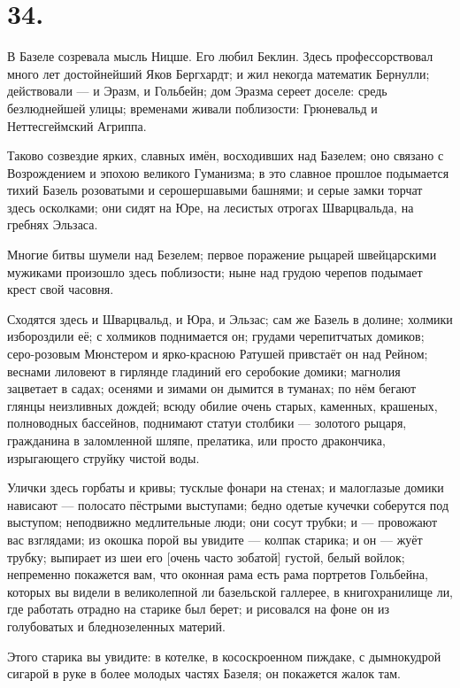 \documentclass[12pt,a4paper,oneside]{book}
\begin{document}
\section*{34.}

В Базеле созревала мысль Ницше. Его любил Беклин. Здесь профессорствовал много лет достойнейший Яков Бергхардт; и жил некогда математик Бернулли; действовали — и Эразм, и Гольбейн; дом Эразма сереет доселе: средь безлюднейшей улицы; временами живали поблизости: Грюневальд и Неттесгеймский Агриппа.

Таково созвездие ярких, славных имён, восходивших над Базелем; оно связано с Возрождением и эпохою великого Гуманизма; в это славное прошлое подымается тихий Базель розоватыми и серошершавыми башнями; и серые замки торчат здесь осколками; они сидят на Юре, на лесистых отрогах Шварцвальда, на гребнях Эльзаса.

Многие битвы шумели над Безелем; первое поражение рыцарей швейцарскими мужиками произошло здесь поблизости; ныне над грудою черепов подымает крест свой часовня.

Сходятся здесь и Шварцвальд, и Юра, и Эльзас; сам же Базель в долине; холмики избороздили её; с холмиков поднимается он; грудами черепитчатых домиков; серо-розовым Мюнстером и ярко-красною Ратушей привстаёт он над Рейном; веснами лиловеют в гирлянде гладиний его серобокие домики; магнолия зацветает в садах; осенями и зимами он дымится в туманах; по нём бегают глянцы неизливных дождей; всюду обилие очень старых, каменных, крашеных, полноводных бассейнов, поднимают статуи столбики — золотого рыцаря, гражданина в заломленной шляпе, прелатика, или просто дракончика, изрыгающего струйку чистой воды.

Улички здесь горбаты и кривы; тусклые фонари на стенах; и малоглазые домики нависают — полосато пёстрыми выступами; бедно одетые кучечки соберутся под выступом; неподвижно медлительные люди; они сосут трубки; и — провожают вас взглядами; из окошка порой вы увидите — колпак старика; и он — жуёт трубку; выпирает из шеи его [очень часто зобатой] густой, белый войлок; непременно покажется вам, что оконная рама есть рама портретов Гольбейна, которых вы видели в великолепной ли базельской галлерее, в книгохранилище ли, где работать отрадно на старике был берет; и рисовался на фоне он из голубоватых и бледнозеленных материй.

Этого старика вы увидите: в котелке, в кососкроенном пиждаке, с дымнокудрой сигарой в руке в более молодых частях Базеля; он покажется жалок там.
\end{document}
